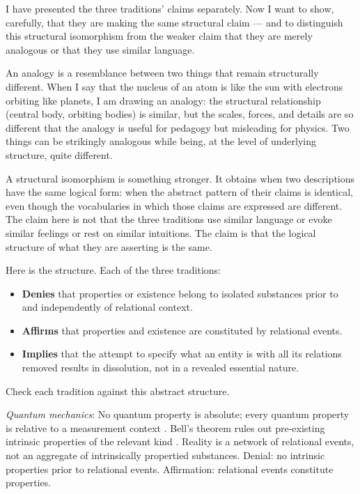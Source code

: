 I have presented the three traditions' claims separately. Now I want to show, carefully, that they are making the same structural claim --- and to distinguish this structural isomorphism from the weaker claim that they are merely analogous or that they use similar language.

An analogy is a resemblance between two things that remain structurally different. When I say that the nucleus of an atom is like the sun with electrons orbiting like planets, I am drawing an analogy: the structural relationship (central body, orbiting bodies) is similar, but the scales, forces, and details are so different that the analogy is useful for pedagogy but misleading for physics. Two things can be strikingly analogous while being, at the level of underlying structure, quite different.

A structural isomorphism is something stronger. It obtains when two descriptions have the same logical form: when the abstract pattern of their claims is identical, even though the vocabularies in which those claims are expressed are different. The claim here is not that the three traditions use similar language or evoke similar feelings or rest on similar intuitions. The claim is that the logical structure of what they are asserting is the same.

Here is the structure. Each of the three traditions:

\begin{itemize}
\item \textbf{Denies} that properties or existence belong to isolated substances prior to and independently of relational context.
\item \textbf{Affirms} that properties and existence are constituted by relational events.
\item \textbf{Implies} that the attempt to specify what an entity is with all its relations removed results in dissolution, not in a revealed essential nature.
\end{itemize}

Check each tradition against this abstract structure.

\emph{Quantum mechanics}: No quantum property is absolute; every quantum property is relative to a measurement context \citep{Rovelli1996}. Bell's theorem rules out pre-existing intrinsic properties of the relevant kind \citep{Bell1964}. Reality is a network of relational events, not an aggregate of intrinsically propertied substances. Denial: no intrinsic properties prior to relational events. Affirmation: relational events constitute properties.

